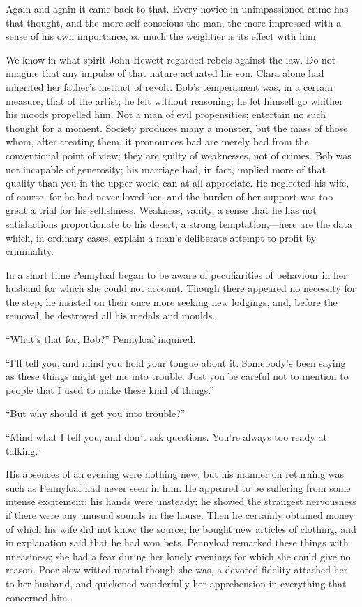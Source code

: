 {\protect\hypertarget{237}{}{}}Again and again it came back to that.
Every novice in unimpassioned crime has that thought, and the more
self-conscious the man, the more impressed with a sense of his own
importance, so much the weightier is its effect with him.

We know in what spirit John Hewett regarded rebels against the law. Do
not imagine that any impulse of that nature actuated his son. Clara
alone had inherited her father's instinct of revolt. Bob's temperament
was, in a certain measure, that of the artist; he felt without
reasoning; he let himself go whither his moods propelled him. Not a man
of evil propensities; entertain no such thought for a moment. Society
produces many a monster, but the mass of those whom, after creating
them, it pronounces bad are merely bad from the conventional point of
view; they are guilty of weaknesses, not of crimes. Bob was not
incapable of generosity; his marriage had, in fact, implied more of that
quality than you in the upper world can at all appreciate. He neglected
his wife, of {\protect\hypertarget{238}{}{}}course, for he had never
loved her, and the burden of her support was too great a trial for his
selfishness. Weakness, vanity, a sense that he has not satisfactions
proportionate to his desert, a strong temptation,---here are the data
which, in ordinary cases, explain a man's deliberate attempt to profit
by criminality.

In a short time Pennyloaf began to be aware of peculiarities of
behaviour in her husband for which she could not account. Though there
appeared no necessity for the step, he insisted on their once more
seeking new lodgings, and, before the removal, he destroyed all his
medals and moulds.

``What's that for, Bob?'' Pennyloaf inquired.

``I'll tell you, and mind you hold your tongue about it. Somebody's been
saying as these things might get me into trouble. Just you be careful
not to mention to people that I used to make these kind of things.''

``But why should it get you into trouble?''

``Mind what I tell you, and don't ask questions. You're always too ready
at talking.''

{\protect\hypertarget{239}{}{}}His absences of an evening were nothing
new, but his manner on returning was such as Pennyloaf had never seen in
him. He appeared to be suffering from some intense excitement; his hands
were unsteady; he showed the strangest nervousness if there were any
unusual sounds in the house. Then he certainly obtained money of which
his wife did not know the source; he bought new articles of clothing,
and in explanation said that he had won bets. Pennyloaf remarked these
things with uneasiness; she had a fear during her lonely evenings for
which she could give no reason. Poor slow-witted mortal though she was,
a devoted fidelity attached her to her husband, and quickened
wonderfully her apprehension in everything that concerned him.

